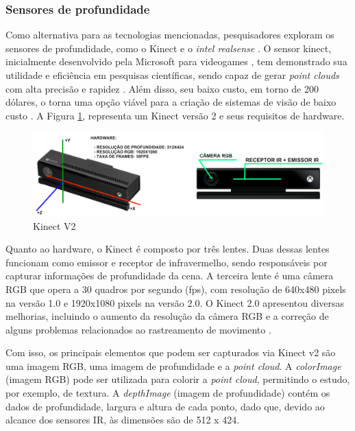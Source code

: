 \subsubsection{Sensores de profundidade}
\label{subsec_Sensores de profundidade}

    Como alternativa para as tecnologias mencionadas, pesquisadores exploram os sensores de profundidade, como o Kinect e o \textit{intel realsense} \cite{ruchay_2018_fusion}. O sensor kinect, inicialmente desenvolvido pela Microsoft para videogames \cite{chan_2018_an}, tem demonstrado sua utilidade e eficiência em pesquisas científicas, sendo capaz de gerar \textit{point clouds} com alta precisão e rapidez \cite{chen_2013_research}. Além disso, seu baixo custo, em torno de 200 dólares, o torna uma opção viável para a criação de sistemas de visão de baixo custo \cite{wan_2012_a}. A Figura \ref{fig:Kinectv2}, representa um Kinect versão 2 e seus requisitos de hardware.
    
        \begin{figure}[h]
           \centering
           \includegraphics[width=1\textwidth]{imagens/KinectV2.png} 
           \caption{Kinect V2}
           \label{fig:Kinectv2}
        \end{figure}

    Quanto ao hardware, o Kinect é composto por três lentes. Duas dessas lentes funcionam como emissor e receptor de infravermelho, sendo responsáveis por capturar informações de profundidade da cena. A terceira lente é uma câmera RGB que opera a 30 quadros por segundo (fps), com resolução de 640x480 pixels na versão 1.0 e 1920x1080 pixels na versão 2.0. O Kinect 2.0 apresentou diversas melhorias, incluindo o aumento da resolução da câmera RGB e a correção de alguns problemas relacionados ao rastreamento de movimento \cite{chan_2018_an, ruchay_2018_fusion}.
    
    Com isso, os principais elementos que podem ser capturados via Kinect v2 são uma imagem RGB, uma imagem de profundidade e a \textit{point cloud}. A \textit{colorImage} (imagem RGB) pode ser utilizada para colorir a \textit{point cloud}, permitindo o estudo, por exemplo, de textura.  A \textit{depthImage} (imagem de profundidade) contém os dados de profundidade, largura e altura de cada ponto, dado que, devido ao alcance dos sensores IR, às dimensões são de 512 x 424.
        
